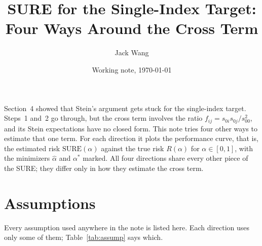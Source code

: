 \documentclass[11pt]{article}
\title{SURE for the Single-Index Target:\\ Four Ways Around the Cross Term}
\author{Jack Wang}
\date{Working note, \today}
\theoremstyle{remark}
\begin{document}
\maketitle

\noindent
Section~4 showed that Stein's argument gets stuck for the single-index target. Steps~1 and~2 go through, but the cross term involves the ratio $f_{ij} = s_{0i}s_{0j}/s_{00}^2$, and its Stein expectations have no closed form. This note tries four other ways to estimate that one term. For each direction it plots the performance curve, that is, the estimated risk $\mathrm{SURE}(\alpha)$ against the true risk $R(\alpha)$ for $\alpha \in [0,1]$, with the minimizers $\hat\alpha$ and $\alpha^*$ marked. All four directions share every other piece of the SURE; they differ only in how they estimate the cross term.

\section{Assumptions}\label{sec:assumptions}

Every assumption used anywhere in the note is listed here. Each direction uses only some of them; Table~\ref{tab:assump} says which.
\end{document}
